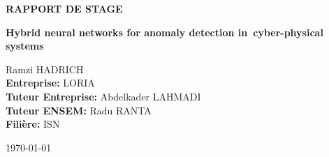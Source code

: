 \pagestyle{empty}
\begin{center}


{\large \textbf{RAPPORT DE STAGE}}
\vspace{8cm}

{\fontsize{18}{18}\selectfont \textbf{Hybrid neural networks for anomaly detection in~cyber-physical systems}}
\end{center}
\normalsize


\vspace{8cm}
\noindent Ramzi HADRICH \\
\textbf{Entreprise:} LORIA\\
\textbf{Tuteur Entreprise:} Abdelkader LAHMADI\\
\textbf{Tuteur ENSEM:} Radu RANTA\\
\textbf{Filière:} ISN\\
\begin{center}
    \today
\end{center}



